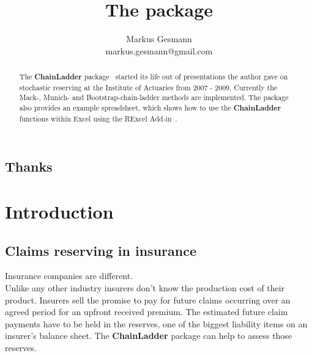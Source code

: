 \documentclass[a4paper]{article}
\title{The \pkg{ChainLadder} package }
\author{Markus Gesmann\\
  markus.gesmann@gmail.com}
\newcommand{\pkg}[1]{\textbf{#1}}
\begin{document}
\maketitle

\begin{abstract}
The \pkg{ChainLadder} package~\citep{chainladder} started its life out of presentations the author gave on stochastic reserving at the Institute of Actuaries from 2007 - 2009. Currently the Mack-, Munich- and Bootstrap-chain-ladder methods are implemented. The package also provides an example spreadsheet, which shows how to use the \pkg{ChainLadder} functions within Excel using the RExcel Add-in~\citep{rexcel}.
\end{abstract}
\subsection*{Thanks}

\clearpage
\tableofcontents
\clearpage
\section{Introduction}

\subsection{Claims reserving in insurance}
Insurance companies are different.\\[2mm]
Unlike any other industry insurers don't know the production cost of their product. 
Insurers sell the promise to pay for future claims occurring over an agreed period for an
upfront received premium. The estimated future claim payments have to be held
in the reserves, one of the biggest liability items on an insurer's balance sheet.
The \pkg{ChainLadder} package can help to assess those reserves.
\end{document}
